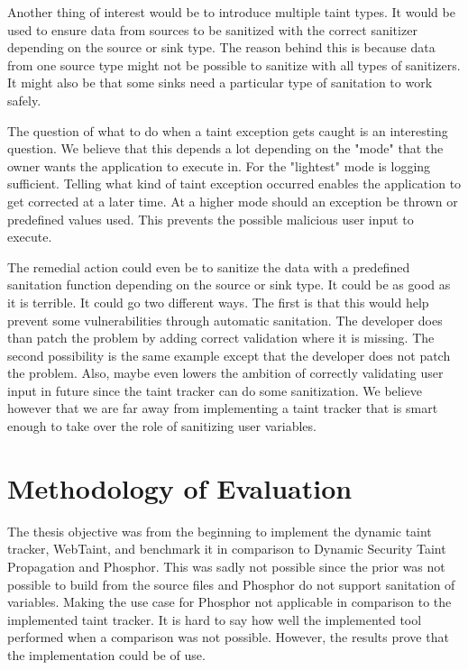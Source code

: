 Another thing of interest would be to introduce multiple taint types. It would be used to ensure data from sources to be sanitized with the correct sanitizer depending on the source or sink type. The reason behind this is because data from one source type might not be possible to sanitize with all types of sanitizers. It might also be that some sinks need a particular type of sanitation to work safely. 

The question of what to do when a taint exception gets caught is an interesting question. We believe that this depends a lot depending on the "mode" that the owner wants the application to execute in. For the "lightest" mode is logging sufficient. Telling what kind of taint exception occurred enables the application to get corrected at a later time. At a higher mode should an exception be thrown or predefined values used. This prevents the possible malicious user input to execute. 

The remedial action could even be to sanitize the data with a predefined sanitation function depending on the source or sink type. It could be as good as it is terrible. It could go two different ways. The first is that this would help prevent some vulnerabilities through automatic sanitation. The developer does than patch the problem by adding correct validation where it is missing. The second possibility is the same example except that the developer does not patch the problem. Also, maybe even lowers the ambition of correctly validating user input in future since the taint tracker can do some sanitization. We believe however that we are far away from implementing a taint tracker that is smart enough to take over the role of sanitizing user variables.



\section{Methodology of Evaluation}
\label{methev}
The thesis objective was from the beginning to implement the dynamic taint tracker, WebTaint, and benchmark it in comparison to Dynamic Security Taint Propagation and Phosphor. This was sadly not possible since the prior was not possible to build from the source files and Phosphor do not support sanitation of variables. Making the use case for Phosphor not applicable in comparison to the implemented taint tracker. It is hard to say how well the implemented tool performed when a comparison was not possible. However, the results prove that the implementation could be of use.
